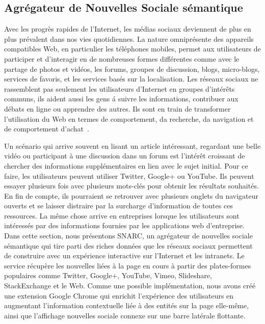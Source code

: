 \subsection{Agr\'{e}gateur de Nouvelles Sociale s\'{e}mantique}

Avec les progr\`{e}s rapides de l'Internet, les m\'{e}dias sociaux deviennent de plus en plus pr\'{e}valent dans nos vies quotidiennes. La nature omnipr\'{e}sente des appareils compatibles Web, en particulier les t\'{e}l\'{e}phones mobiles, permet aux utilisateurs de participer et d'interagir en de nombreuses formes diff\'{e}rentes comme avec le partage de photos et vid\'{e}os, les forums, groupes de discussion, blogs, micro-blogs, services de favoris, et les services bas\'{e}s sur la localisation. Les r\'{e}seaux sociaux ne rassemblent pas seulement les utilisateurs d'Internet en groupes d'int\'{e}r\^{e}ts communs, ils aident aussi les gens \'a suivre les informations, contribuer aux d\'{e}bats en ligne ou apprendre des autres. Ils sont en train de transformer l'utilisation du Web en termes de comportement, da recherche, da navigation et de comportement d'achat~\cite{Bakshy:WWW:12}.

Un sc\'{e}nario qui arrive souvent en lisant un article int\'{e}ressant, regardant une belle vid\'{e}o ou participant \`{a} une discussion dans un forum est l'int\'{e}r\^{e}t croissant de chercher des informations suppl\'{e}mentaires en lien avec le sujet initial. Pour ce faire, les utilisateurs peuvent utiliser Twitter, Google+ ou YouTube. Ils peuvent essayer plusieurs fois avec plusieurs mots-cl\'{e}s pour obtenir les r\'{e}sultats souhait\'{e}s. En fin de compte, ils pourraient se retrouver avec plusieurs onglets du navigateur ouverts et se laisser distraire par la surcharge d'information de toutes ces ressources. La m\^{e}me chose arrive en entreprises lorsque les utilisateurs sont int\'{e}ress\'{e}s par des informations fournies par les applications web d'entreprise. Dans cette section, nous pr\'{e}sentons SNARC, un agr\'{e}gateur de nouvelles sociale s\'{e}mantique qui tire parti des riches donn\'{e}es que les r\'{e}seaux sociaux permettent de construire avec un exp\'{e}rience interactive sur l'Internet et les intranets. Le service r\'{e}cup\`{e}re les nouvelles li\'{e}es \`{a} la page en cours \`{a} partir des plates-formes populaires comme Twitter, Google+, YouTube, Vimeo, Slideshare, StackExchange et le Web. Comme une possible impl\'{e}mentation, nous avons cr\'{e}\'{e} une extension Google Chrome qui enrichit l'exp\'{e}rience des utilisateurs en augmentant l'information contextuelle li\'{e}e \`{a} des entit\'{e}s sur la page elle-m\^{e}me, ainsi que l'affichage nouvelles sociale connexe sur une barre lat\'{e}rale flottante.

